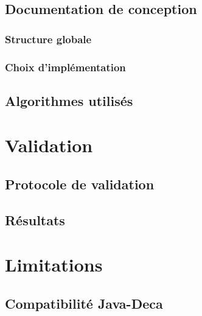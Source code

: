 \documentclass[12pt, a4paper, one side]{article}
\begin{document}
    \subsection{Documentation de conception}
    \subsubsection{Structure globale}
    \subsubsection{Choix d'implémentation}
    \subsection{Algorithmes utilisés}

    \section{Validation}
    \subsection{Protocole de validation}
    \subsection{Résultats}

    \section{Limitations}
    \subsection{Compatibilité Java-Deca}

    \newpage
    \printbibliography
\end{document}
